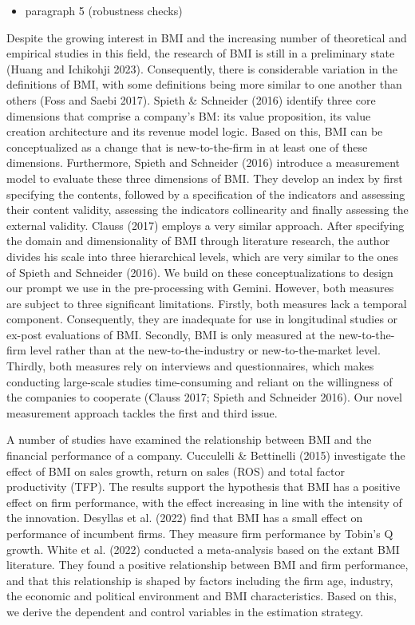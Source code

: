 \documentclass[
]{article}
\providecommand{\tightlist}{%
  \setlength{\itemsep}{0pt}\setlength{\parskip}{0pt}}\usepackage{longtable,booktabs,array}
\begin{document}
\begin{itemize}
\tightlist
\item
  paragraph 5 (robustness checks)
\end{itemize}

Despite the growing interest in BMI and the increasing number of
theoretical and empirical studies in this field, the research of BMI is
still in a preliminary state (Huang and Ichikohji 2023). Consequently,
there is considerable variation in the definitions of BMI, with some
definitions being more similar to one another than others (Foss and
Saebi 2017). Spieth \& Schneider (2016) identify three core dimensions
that comprise a company's BM: its value proposition, its value creation
architecture and its revenue model logic. Based on this, BMI can be
conceptualized as a change that is new-to-the-firm in at least one of
these dimensions. Furthermore, Spieth and Schneider (2016) introduce a
measurement model to evaluate these three dimensions of BMI. They
develop an index by first specifying the contents, followed by a
specification of the indicators and assessing their content validity,
assessing the indicators collinearity and finally assessing the external
validity. Clauss (2017) employs a very similar approach. After
specifying the domain and dimensionality of BMI through literature
research, the author divides his scale into three hierarchical levels,
which are very similar to the ones of Spieth and Schneider (2016). We
build on these conceptualizations to design our prompt we use in the
pre-processing with Gemini. However, both measures are subject to three
significant limitations. Firstly, both measures lack a temporal
component. Consequently, they are inadequate for use in longitudinal
studies or ex-post evaluations of BMI. Secondly, BMI is only measured at
the new-to-the-firm level rather than at the new-to-the-industry or
new-to-the-market level. Thirdly, both measures rely on interviews and
questionnaires, which makes conducting large-scale studies
time-consuming and reliant on the willingness of the companies to
cooperate (Clauss 2017; Spieth and Schneider 2016). Our novel
measurement approach tackles the first and third issue.

A number of studies have examined the relationship between BMI and the
financial performance of a company. Cucculelli \& Bettinelli (2015)
investigate the effect of BMI on sales growth, return on sales (ROS) and
total factor productivity (TFP). The results support the hypothesis that
BMI has a positive effect on firm performance, with the effect
increasing in line with the intensity of the innovation. Desyllas et al.
(2022) find that BMI has a small effect on performance of incumbent
firms. They measure firm performance by Tobin's Q growth. White et al.
(2022) conducted a meta-analysis based on the extant BMI literature.
They found a positive relationship between BMI and firm performance, and
that this relationship is shaped by factors including the firm age,
industry, the economic and political environment and BMI
characteristics. Based on this, we derive the dependent and control
variables in the estimation strategy.
\end{document}
